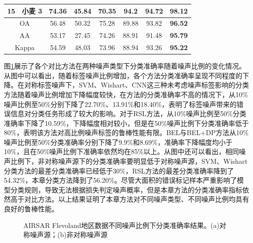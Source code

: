 \begin{table}[ht!]
\begin{tabular}{cccccccc}
        15                        & 小麦 3  & 74.36 & 45.84   & 70.35 & 94.2           & 94.72          & \textbf{98.12} \\
        \midrule[0.75bp]
        \multicolumn{2}{c}{OA}    & 56.48 & 50.32 & 75.28   & 89.88 & 93.82          & \textbf{96.52}                  \\
        \multicolumn{2}{c}{AA}    & 53.17 & 27.45 & 74.26   & 88.91 & 91.48          & \textbf{95.79}                  \\
        \multicolumn{2}{c}{Kappa} & 54.59 & 48.03 & 73.96   & 88.94 & 93.26          & \textbf{95.22}                  \\
        \bottomrule[1.5bp]
    \end{tabular}
\end{table}

图\ref{fig:fle_noise}展示了各个对比方法在两种噪声类型下分类准确率随着噪声比例的变化情况。从图中可以看出，随着标签噪声比例增加，各个方法分类准确率呈现不同程度的下降。在对称标签噪声下，SVM、Wishart、CNN这三种未考虑噪声标签影响的分类方法随着噪声比例增加下降幅度较快，在方法的分类准确率不高的情况下，从10\%噪声比例至50\%分别下降了22.70\%、13.91\%和18.40\%，表明了标签噪声带来的错误信息对分类任务形成了较大的影响。对于RSL方法，从10\%噪声比例至50\%分类准确率下降了10.59\%，下降幅度相对较小，但是在50\%噪声比例下分类准确率低于80\%，表明该方法对高比例噪声标签的鲁棒性能有限。BEL与BEL+DP方法从10\%噪声比例至50\%分类准确率分别下降了9.9\%和8.69\%，准确率下降幅度均小于10\%，且在50\%噪声比例下准确率依然均在85\%以上。从图中还可以看出，相同噪声比例下，非对称噪声源下的分类准确率要明显低于对称噪声源，SVM、Wishart分类方法的最差分类准确率已经低于30\%，RSL方法的最差分类准确率降到了54.32\%，本章分类方法降到了56.20\%。尽管大面积的错误标记样本严重影响了模型分类规则，导致无法根据损失判定噪声概率，但是本章方法的分类准确率指标依然高于对比方法。以上结果证明了本章方法对不同噪声类型、不同噪声比例均具有良好的鲁棒性能。

\begin{figure}[ht!]
    \caption{AIRSAR Flevoland地区数据不同噪声比例下分类准确率结果。(a)对称噪声源；(b)非对称噪声源}
    \label{fig:fle_noise}
\end{figure}

